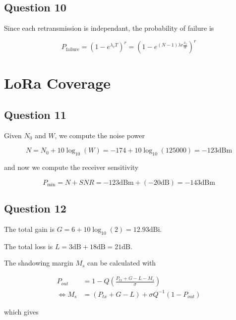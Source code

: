 \documentclass[]{article}
\begin{document}
	\subsection*{Question 10}
	
	Since each retransmission is independant, the probability of failure is
	
	\begin{equation}
		P_{\text{failure}} = \left(1 - e^{\lambda_v T}\right)^r = \left(1 - e^{(N-1)\lambda r \frac{\delta_f}{W}}\right)^r
	\end{equation}
	
	\section{LoRa Coverage}
	
	\subsection*{Question 11}
	
	Given $N_0$ and $W$, we compute the noise power
	
	\begin{equation}
		N = N_0 + 10\log_{10}(W) = -174 + 10\log_{10}(125000) = -123\text{dBm}
	\end{equation}
	
	and now we compute the receiver sensitivity
	
	\begin{equation}
		P_{\text{min}} = N + SNR = -123\text{dBm} + (-20 \text{dB}) = -143\text{dBm}
	\end{equation}
	
	\subsection*{Question 12}
	
	The total gain is $G = 6 + 10\log_{10}(2) = 12.93\text{dBi}$.
	
	The total loss is $L = 3\text{dB} + 18\text{dB} = 21\text{dB}$.
	
	The shadowing margin $M_s$ can be calculated with
	
	\begin{align}
		P_{out} &= 1 - Q\left(\frac{P_{tx} + G - L - M_s}{\sigma}\right) \\
		\iff M_s &= (P_{tx} + G - L) + \sigma Q^{-1}(1 - P_{out})
	\end{align}
	
	which gives
	
\end{document}
